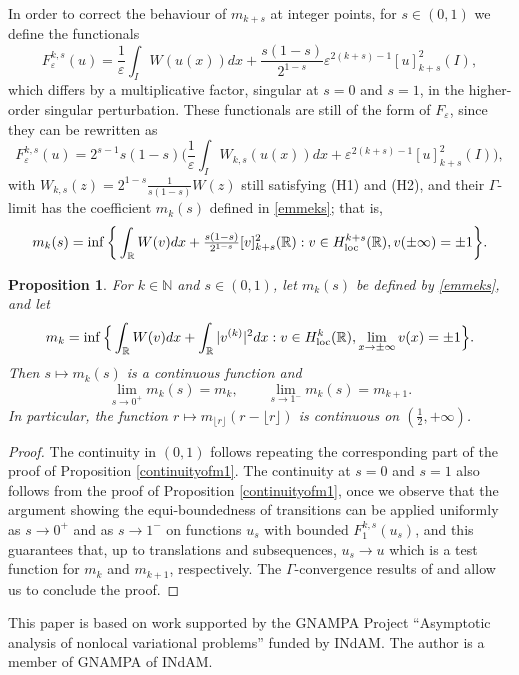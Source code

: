 \documentclass{article}
\newtheorem{proposition}[lemma]{Proposition}
\newcommand{\e}{\varepsilon}
\begin{document}
In order to correct the behaviour of $m_{k+s}$ at integer points, for $s\in(0,1)$ we define the functionals
\begin {equation}
F^{k,s}_\e(u)=\frac1\e\int_I W(u(x))dx+\frac{s(1-s)}{2^{1-s}}\e^{2(k+s)-1}[u]^2_{k+s}(I),
\end{equation}
which differs by a multiplicative factor, singular at $s=0$ and $s=1$, in the higher-order singular perturbation.
These functionals are still of the form of $F_\e$, since they can be rewritten as
$$
F^{k,s}_\e(u)=2^{s-1}s(1-s)\Big(\frac1\e\int_I W_{k,s}(u(x))dx+\e^{2(k+s)-1}[u]^2_{k+s}(I)\Big),
$$
with $W_{k,s}(z)= 2^{1-s}\frac{1}{s(1-s)}W(z)$ still satisfying (H1) and (H2), and their $\Gamma$-limit has the coefficient $m_k(s)$ defined in \eqref{emmeks}; that is,
\[
 m_{k}(s) =\inf\bigg\{\int_{\mathbb R} W(v)dx+\tfrac{s(1-s)}{2^{1-s}}[v]^2_{k+s}(\mathbb R) :v\in H^{k+s}_{\rm loc}(\mathbb R), v(\pm\infty)=\pm1\bigg\}.
\]



\begin{proposition}\label{continuityofm2} For $k\in\mathbb N$ and $s\in(0,1)$, let $m_{k}(s)$ be defined by 
\eqref{emmeks}, and let 
\begin{equation}\label{emmek}
m_{k}=\inf\Big\{\int_{\mathbb R} W(v)dx+\int_\mathbb R|v^{(k)}|^2 dx : v\in H^{k}_{\rm loc}(\mathbb R), \lim_{x\to\pm\infty}v(x)=\pm1\Big\}.
\end{equation}
Then $s\mapsto m_k(s)$ is a continuous function and
\begin{equation}\label{limeks}
\lim_{s\to 0^+} m_k(s)= m_k,\qquad \lim_{s\to 1^-} m_k(s)= m_{k+1}.
\end{equation}
In particular, the function $r\mapsto m_{\lfloor r\rfloor}(r-\lfloor r\rfloor) $ is continuous on $(\frac12,+\infty)$.
\end{proposition}

\begin{proof} The continuity in $(0,1)$ follows repeating the corresponding part of the proof of Proposition \ref{continuityofm1}. The continuity at $s=0$ and $s=1$ also follows from the proof of Proposition \ref{continuityofm1}, once we observe that the argument showing the equi-boundedness of transitions can be applied uniformly as $s\to 0^+$ and as $s\to 1^-$ on functions $u_s$ with bounded $F^{k,s}_1(u_s)$, and this guarantees that, up to translations and subsequences, $u_s\to u$ which is a test function for $m_k$ and $m_{k+1}$, respectively. The $\Gamma$-convergence results of \cite{MS} and \cite{ponce} allow us to conclude the proof.
\end{proof}

 This paper is based on work supported by the GNAMPA Project ``Asymptotic analysis of nonlocal variational problems'' funded by INdAM.  
The author is a member of GNAMPA of INdAM. 





\end{document}
